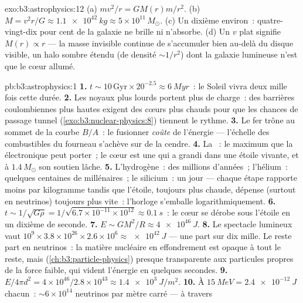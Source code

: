 \begin{solution}{exo:b3:astrophysics:12}
(a) $mv^2/r = GM(r)m/r^2$. (b) $M = v^2r/G \approx
\qty{1.1e42}{kg} \approx 5\times10^{11}\,M_\odot$. (c) Un dixième
environ~: quatre-vingt-dix pour cent de la galaxie ne brille ni
n'absorbe. (d) Un $v$ plat signifie $M(r) \propto r$ --- la masse
invisible continue de s'accumuler bien au-delà du disque visible, un
halo sombre étendu (de densité $\sim1/r^2$) dont la galaxie lumineuse
n'est que le cœur allumé.
\end{solution}

\begin{solution}{pb:b3:astrophysics:1}
\textbf{1.} $t \sim 10\,\text{Gyr}\times20^{-2.5} \approx
\qty{6}{Myr}$~: le Soleil vivra deux mille fois cette durée.
\textbf{2.} Les noyaux plus lourds portent plus de charge~: des
barrières coulombiennes plus hautes exigent des cœurs plus chauds
pour que les chances de passage tunnel
(\cref{exo:b3:nuclear-physics:8}) tiennent le rythme.
\textbf{3.} Le fer trône au sommet de la courbe $B/A$~: le fusionner
\emph{coûte} de l'énergie --- l'échelle des combustibles du fourneau
s'achève sur de la cendre.
\textbf{4.} La ~: le maximum que la  électronique peut porter~; le cœur est une  qui a grandi dans une étoile vivante, et à $1.4\,M_\odot$
son soutien lâche.
\textbf{5.} L'hydrogène~: des millions d'années~; l'hélium~:
quelques centaines de millénaires~; le silicium~: un jour --- chaque
étape rapporte moins par kilogramme tandis que l'étoile, toujours
plus chaude, dépense (surtout en neutrinos) toujours plus vite~:
l'horloge s'emballe logarithmiquement.
\textbf{6.} $t \sim 1/\sqrt{G\rho} =
1/\sqrt{6.7\times10^{-11}\times10^{12}} \approx \qty{0.1}{s}$~:
le cœur se dérobe sous l'étoile en un dixième de seconde.
\textbf{7.} $E \sim GM^2/R \approx \qty{4e46}{J}$.
\textbf{8.} Le spectacle lumineux vaut $10^9\times3.8\times10^{26}
\times2.6\times10^{6} \approx \qty{e42}{J}$ --- une part sur dix
mille. Le reste part en neutrinos~: la matière nucléaire en
effondrement est opaque à tout le reste, mais
(\cref{ch:b3:particle-physics}) presque transparente aux particules
propres de la force faible, qui vident l'énergie en quelques
secondes.
\textbf{9.} $E/4\pi d^2 = 4\times10^{46}/2.8\times10^{43}
\approx \qty{1.4e3}{J/m^2}$.
\textbf{10.} À $\qty{15}{MeV} = \qty{2.4e-12}{J}$ chacun~:
${\sim}6\times10^{14}$ neutrinos par mètre carré --- à travers

\end{solution}
